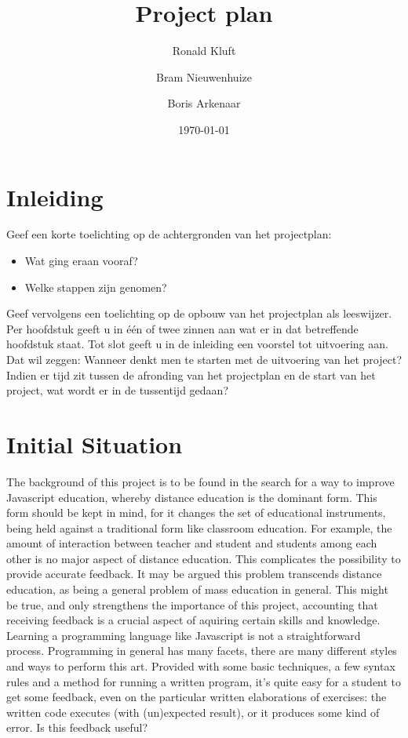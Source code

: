 \documentclass{article}
\begin{document}
\title{Project plan}
\author{Ronald Kluft \and Bram Nieuwenhuize \and Boris Arkenaar}
\date{\today}
\maketitle

\section{Inleiding}

Geef een korte toelichting op de achtergronden van het projectplan:
\begin{itemize}
  \item Wat ging eraan vooraf?
  \item Welke stappen zijn genomen?
\end{itemize}

Geef vervolgens een toelichting op de opbouw van het projectplan als leeswijzer. Per hoofdstuk geeft u in één of twee zinnen aan wat er in dat betreffende hoofdstuk staat. Tot slot geeft u in de inleiding een voorstel tot uitvoering aan.
Dat wil zeggen:
Wanneer denkt men te starten met de uitvoering van het project?
Indien er tijd zit tussen de afronding van het projectplan en de start van het project, wat wordt er in de tussentijd gedaan?

\section{Initial Situation}

\noindent
The background of this project is to be found in the search for a way to improve Javascript education, whereby distance education is the dominant form. This form should be kept in mind, for it changes the set of educational instruments, being held against a traditional form like classroom education. For example, the amount of interaction between teacher and student and students among each other is no major aspect of distance education. This complicates the possibility to provide accurate feedback. It may be argued this problem transcends distance education, as being a general problem of mass education in general. This might be true, and only strengthens the importance of this project, accounting that receiving feedback is a crucial aspect of aquiring certain skills and knowledge. 
\newline
Learning a programming language like Javascript is not a straightforward process. Programming in general has many facets, there are many different styles and ways to perform this art. Provided with some basic techniques, a few syntax rules and a method for running a written program, it's quite easy for a student to get some feedback, even on the particular written elaborations of exercises: the written code executes (with (un)expected result), or it produces some kind of error. Is this feedback useful? 
\end{document}
